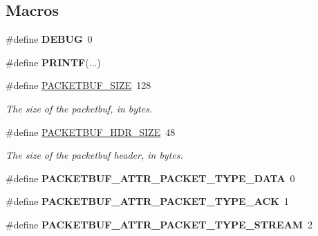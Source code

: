 \subsection*{Macros}
\begin{DoxyCompactItemize}
\item 
\hypertarget{group__packetbuf_gad72dbcf6d0153db1b8d8a58001feed83}{}\#define {\bfseries D\+E\+B\+U\+G}~0\label{group__packetbuf_gad72dbcf6d0153db1b8d8a58001feed83}

\item 
\hypertarget{group__packetbuf_ga1f464e950a4fa11e8821b5c725921a15}{}\#define {\bfseries P\+R\+I\+N\+T\+F}(...)\label{group__packetbuf_ga1f464e950a4fa11e8821b5c725921a15}

\item 
\hypertarget{group__packetbuf_ga7a3b189fd04b82463abb4117fdb26b67}{}\#define \hyperlink{group__packetbuf_ga7a3b189fd04b82463abb4117fdb26b67}{P\+A\+C\+K\+E\+T\+B\+U\+F\+\_\+\+S\+I\+Z\+E}~128\label{group__packetbuf_ga7a3b189fd04b82463abb4117fdb26b67}

\begin{DoxyCompactList}\small\item\em The size of the packetbuf, in bytes. \end{DoxyCompactList}\item 
\hypertarget{group__packetbuf_gaf99c845894c567c1222a56be9c6cfe5b}{}\#define \hyperlink{group__packetbuf_gaf99c845894c567c1222a56be9c6cfe5b}{P\+A\+C\+K\+E\+T\+B\+U\+F\+\_\+\+H\+D\+R\+\_\+\+S\+I\+Z\+E}~48\label{group__packetbuf_gaf99c845894c567c1222a56be9c6cfe5b}

\begin{DoxyCompactList}\small\item\em The size of the packetbuf header, in bytes. \end{DoxyCompactList}\item 
\hypertarget{group__packetbuf_ga51333e5de8dd6e51a380a62e0e8465e8}{}\#define {\bfseries P\+A\+C\+K\+E\+T\+B\+U\+F\+\_\+\+A\+T\+T\+R\+\_\+\+P\+A\+C\+K\+E\+T\+\_\+\+T\+Y\+P\+E\+\_\+\+D\+A\+T\+A}~0\label{group__packetbuf_ga51333e5de8dd6e51a380a62e0e8465e8}

\item 
\hypertarget{group__packetbuf_gaf6798df81e0305809ab69e4c1c21ee3d}{}\#define {\bfseries P\+A\+C\+K\+E\+T\+B\+U\+F\+\_\+\+A\+T\+T\+R\+\_\+\+P\+A\+C\+K\+E\+T\+\_\+\+T\+Y\+P\+E\+\_\+\+A\+C\+K}~1\label{group__packetbuf_gaf6798df81e0305809ab69e4c1c21ee3d}

\item 
\hypertarget{group__packetbuf_ga473bd497a7759554bb01b6ccccf75813}{}\#define {\bfseries P\+A\+C\+K\+E\+T\+B\+U\+F\+\_\+\+A\+T\+T\+R\+\_\+\+P\+A\+C\+K\+E\+T\+\_\+\+T\+Y\+P\+E\+\_\+\+S\+T\+R\+E\+A\+M}~2\label{group__packetbuf_ga473bd497a7759554bb01b6ccccf75813}


\end{DoxyCompactItemize}
